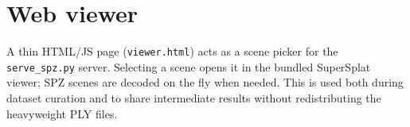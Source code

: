 \section{Web viewer}

A thin HTML/JS page (\texttt{viewer.html}) acts as a scene picker for the
\texttt{serve\_spz.py} server. Selecting a scene opens it in the bundled
SuperSplat viewer; SPZ scenes are decoded on the fly when needed. This is
used both during dataset curation and to share intermediate results
without redistributing the heavyweight PLY files.
